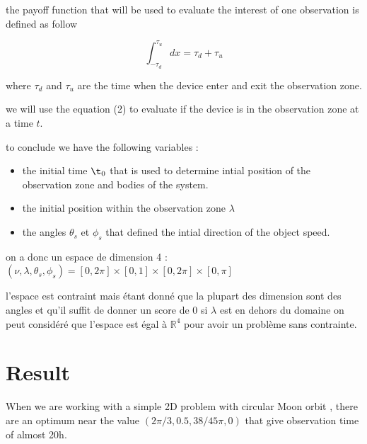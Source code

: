 \documentclass[11pt]{article} %
\begin{document}
		the payoff function that will be used to evaluate the interest of one observation is defined as follow
		
		$$
		\int_{-\tau_d}^{\tau_u}dx=\tau_d+\tau_u
		$$
		
		
		where  $\tau_d$ and $\tau_u$ are the time when the device enter and exit the observation zone.
		
		we will use the equation (2) to evaluate if the device is in the observation zone at a time $t$.
		
		
		
		to conclude we have the following variables : 
		
		\begin{itemize}
			\item the initial time $\t_0$ that is used to determine intial position of the observation zone and bodies of the system.%
			\item the initial position within the observation zone $\lambda$ %
			\item the angles $\theta_s$ et $\phi_s$ that defined the intial direction of the object speed.%
		\end{itemize}
		
		on a donc un espace de dimension 4 :
		$(\nu,\lambda,\theta_s,\phi_s)=[0,2\pi]\times[0,1]\times[0,2\pi]\times[0,\pi]$
		
		l'espace est contraint mais étant donné que la plupart des dimension sont des angles et qu'il suffit de donner un score de 0 si $\lambda$ est en dehors du domaine on peut considéré que l'espace est égal à $\mathbb{R}^4$ pour avoir un problème sans contrainte.
		
		\section{Result}
			
		When we are working with a simple 2D problem with circular Moon orbit , there are an optimum near the value $(2\pi/3,0.5,38/45\pi,0)$ that give observation time of almost 20h.
		
\end{document}
